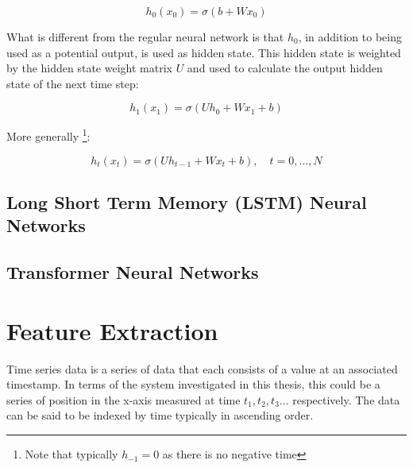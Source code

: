 \begin{equation}
    h_0(x_0) = \sigma(b + Wx_0)
\end{equation}

What is different from the regular neural network is that $h_0$, in addition to being used as a potential output,  is used as hidden state. This hidden state is weighted by the hidden state weight matrix $U$ and used to calculate the output hidden state of the next time step:

\begin{equation}
    h_1(x_1) = \sigma(Uh_0+Wx_1+b)
\end{equation}

More generally \cite{salemRecurrentNeuralNetworks2022}\footnote{Note that typically $h_{-1}=0$ as there is no negative time}:

\begin{equation}
    h_t(x_t) = \sigma(Uh_{t-1} + Wx_t+b), \quad t=0,...,N
\end{equation}

\subsection{Long Short Term Memory (LSTM) Neural Networks}
\subsection{Transformer Neural Networks}

\section{Feature Extraction}
Time series data is a series of data that each consists of a value at an associated timestamp. In terms of the system investigated in this thesis, this could be a series of position in the x-axis measured at time $t_1, t_2, t_3...$ respectively. The data can be said to be indexed by time \cite{yinPredictionAnalysisTime2023} typically in ascending order.

